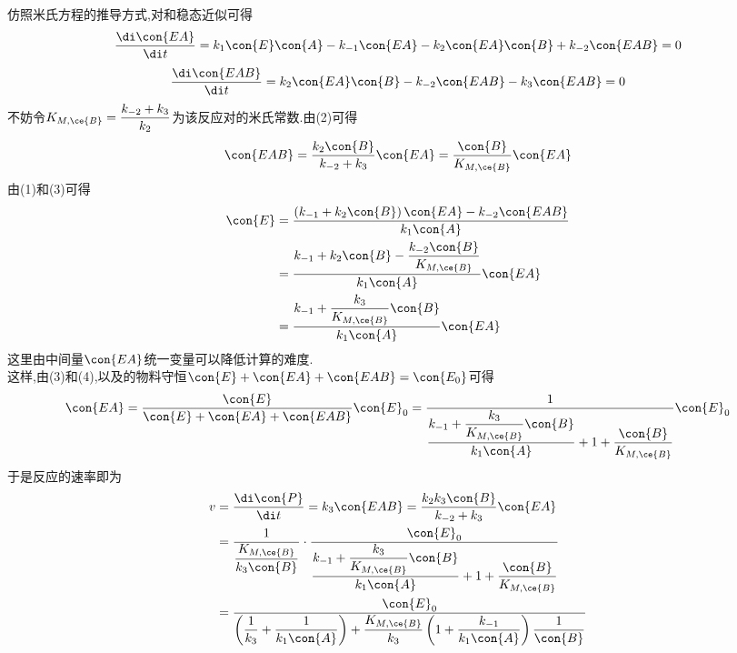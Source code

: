 \documentclass{ctexart}
\begin{document}
\begin{derivation}\setcounter{equation}{0}
    仿照米氏方程的推导方式,对和稳态近似可得
    \begin{equation}
        \dfrac{\di\con{EA}}{\di t}=k_1\con{E}\con{A}-k_{-1}\con{EA}-k_2\con{EA}\con{B}+k_{-2}\con{EAB}=0
    \end{equation}
    \begin{equation}
        \dfrac{\di\con{EAB}}{\di t}=k_2\con{EA}\con{B}-k_{-2}\con{EAB}-k_3\con{EAB}=0
    \end{equation}
    不妨令$K_{M,\ce{B}}=\dfrac{k_{-2}+k_3}{k_2}$为该反应对的米氏常数.由(2)可得
    \begin{equation}
        \con{EAB}=\dfrac{k_2\con{B}}{k_{-2}+k_3}\con{EA}=\dfrac{\con{B}}{K_{M,\ce{B}}}\con{EA}
    \end{equation}
    由(1)和(3)可得
    \begin{equation}
        \begin{aligned}
            \con{E}
            &= \dfrac{\left(k_{-1}+k_2\con{B}\right)\con{EA}-k_{-2}\con{EAB}}{k_1\con{A}} \\
            &= \dfrac{k_{-1}+k_2\con{B}-\dfrac{k_{-2}\con{B}}{K_{M,\ce{B}}}}{k_1\con{A}}\con{EA} \\
            &= \dfrac{k_{-1}+\dfrac{k_3}{K_{M,\ce{B}}}\con{B}}{k_1\con{A}}\con{EA}
        \end{aligned}
    \end{equation}
    这里由中间量$\con{EA}$统一变量可以降低计算的难度.\\
    这样,由(3)和(4),以及的物料守恒$\con{E}+\con{EA}+\con{EAB}=\con{E_0}$可得
    \begin{equation}
        \con{EA}
        =\dfrac{\con{E}}{\con{E}+\con{EA}+\con{EAB}}\con{E}_0
        =\dfrac{1}{\dfrac{k_{-1}+\dfrac{k_3}{K_{M,\ce{B}}}\con{B}}{k_1\con{A}}+1+\dfrac{\con{B}}{K_{M,\ce{B}}}}\con{E}_0
    \end{equation}
    于是反应的速率即为
    \begin{equation}
        \begin{aligned}
            v
            &= \dfrac{\di\con{P}}{\di t}=k_3\con{EAB}=\dfrac{k_2k_3\con{B}}{k_{-2}+k_3}\con{EA} \\
            &= \dfrac{1}{\dfrac{K_{M,\ce{B}}}{k_3\con{B}}}\cdot\dfrac{\con{E}_0}{\dfrac{k_{-1}+\dfrac{k_3}{K_{M,\ce{B}}}\con{B}}{k_1\con{A}}+1+\dfrac{\con{B}}{K_{M,\ce{B}}}} \\
            &= \dfrac{\con{E}_0}{\left(\dfrac{1}{k_3}+\dfrac{1}{k_1\con{A}}\right)+\dfrac{K_{M,\ce{B}}}{k_3}\left(1+\dfrac{k_{-1}}{k_1\con{A}}\right)\dfrac{1}{\con{B}}}

\end{aligned}
\end{equation}
\end{derivation}
\end{document}
